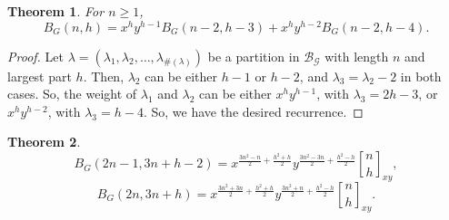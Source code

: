 \documentclass[12pt]{amsart}
\newtheorem{theorem}{Theorem}[section]
\theoremstyle{definition}
\theoremstyle{remark}
\numberwithin{equation}{section}
\begin{document}
\begin{theorem}
For $n\geq1$,
\begin{equation}\label{eq:BGRec}
B_G(n,h)=x^{h}y^{h-1}B_G(n-2,h-3)+x^{h}y^{h-2}B_G(n-2,h-4).
\end{equation}
\end{theorem}
\begin{proof}
Let $\lambda=(\lambda_1,\lambda_2,\ldots,\lambda_{\#(\lambda)})$ be a partition in $\mathcal{B}_{\mathcal{G}}$ with length $n$ and largest part $h$. Then, $\lambda_{2}$ can be either $h-1$ or $h-2$, and $\lambda_3=\lambda_2-2$ in both cases. So, the weight of $\lambda_1$ and $\lambda_2$ can be either $x^hy^{h-1}$, with $\lambda_3=2h-3$, or $x^hy^{h-2}$, with $\lambda_3=h-4$. So, we have the desired recurrence.     
\end{proof}

\begin{theorem}
\begin{equation}\label{eq:BGOdd}
B_G(2n-1,3n+h-2)=x^{\frac{3n^2-n}{2}+\frac{h^2+h}{2}}y^{\frac{3n^2-3n}{2}+\frac{h^2-h}{2}}{n\brack h}_{xy},
\end{equation}
\begin{equation}\label{eq:BGEven}
B_G(2n,3n+h)=x^{\frac{3n^2+3n}{2}+\frac{h^2+h}{2}}y^{\frac{3n^2+n}{2}+\frac{h^2-h}{2}}{n\brack h}_{xy}.
\end{equation}
\end{theorem}
\end{document}
